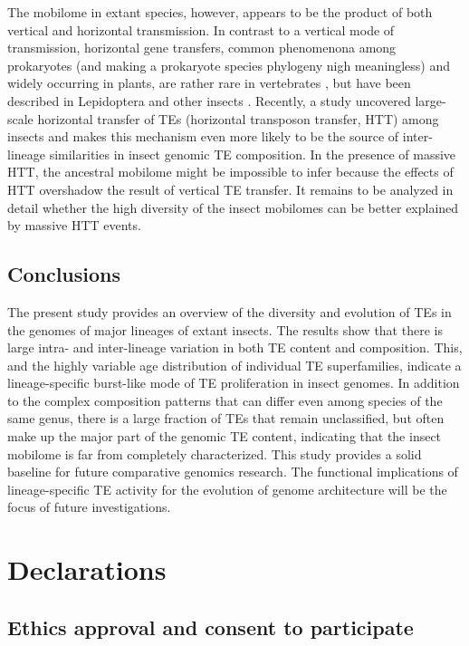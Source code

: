 The mobilome in extant species, however, appears to be the product of
both vertical and horizontal transmission. In contrast to a vertical
mode of transmission, horizontal gene transfers, common phenomenona
among prokaryotes (and making a prokaryote species phylogeny nigh
meaningless) and widely occurring in plants, are rather rare in
vertebrates \citep{Syvanen2012,Wallau2012}, but have been described in Lepidoptera
\citep{Sormacheva2012} and other insects \citep{Nakabachi2015}. Recently, a
study uncovered large-scale horizontal transfer of TEs (horizontal
transposon transfer, HTT) among insects \citep{Peccoud2017} and makes
this mechanism even more likely to be the source of inter-lineage
similarities in insect genomic TE composition. In the presence of
massive HTT, the ancestral mobilome might be impossible to infer because
the effects of HTT overshadow the result of vertical TE transfer. It
remains to be analyzed in detail whether the high diversity of the
insect mobilomes can be better explained by massive HTT events.

\subsection{Conclusions}

The present study provides an overview of the diversity and evolution of TEs in the genomes of major lineages of extant insects.
The results show that there is large intra- and inter-lineage variation in both TE content and composition.
This, and the highly variable age distribution of individual TE superfamilies, indicate a lineage-specific burst-like mode of TE proliferation in insect genomes.
In addition to the complex composition patterns that can differ even among species of the same genus, there is a large fraction of TEs that remain unclassified, but often make up the major part of the genomic TE content, indicating that the insect mobilome is far from completely characterized.
This study provides a solid baseline for future comparative genomics research.
The functional implications of lineage-specific TE activity for the evolution of genome architecture will be the focus of future investigations.


\section{Declarations}\label{declarations}



\subsection{Ethics approval and consent to
participate}\label{ethics-approval-and-consent-to-participate}

